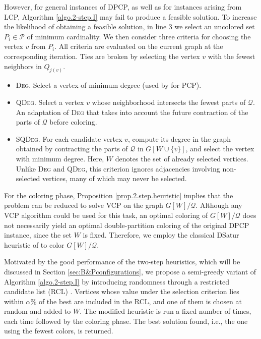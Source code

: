 \documentclass[preprint, 11pt, authoryear]{elsarticle}
\newcommand{\PP}{{\mathcal P}}
\newcommand{\QQ}{{\mathcal Q}}
\begin{document}
However, for general instances of DPCP, as well as for instances arising from LCP, Algorithm \ref{algo.2-step.I} may fail to produce a feasible solution. 
To increase the likelihood of obtaining a feasible solution, in line 3 we select an uncolored set $P_i \in \PP$ of minimum cardinality. 
We then consider three criteria for choosing the vertex $v$ from $P_i$.
All criteria are evaluated on the current graph at the corresponding iteration. Ties are broken by selecting the vertex $v$ with the fewest neighbors in $Q_{j(v)}$.
\begin{itemize}
\item[] \textsc{Deg.} Select a vertex of minimum degree (used by \cite{li2000partition} for PCP).
\item[] \textsc{QDeg.} Select a vertex $v$ whose neighborhood intersects the fewest parts of $\QQ$. An adaptation of \textsc{Deg} that takes into account the future contraction of the parts of $\QQ$ before coloring.
\item[] \textsc{SQDeg.} 
For each candidate vertex $v$, compute its degree in the graph obtained by contracting the parts of $\QQ$ in $G[W \cup \{v\}]$, and select the vertex with minimum degree. Here, $W$ denotes the set of already selected vertices. Unlike \textsc{Deg} and \textsc{QDeg}, this criterion ignores adjacencies involving non-selected vertices, many of which may never be selected.
\end{itemize}

For the coloring phase, Proposition \ref{prop.2.step.heuristic} implies that the problem can be reduced to solve VCP on the graph $G[W]/\QQ$.  Although any VCP algorithm could be used for this task, an optimal coloring of $G[W]/\QQ$ does not necessarily yield an optimal double-partition coloring of the original DPCP instance, since the set $W$ is fixed. 
Therefore, we employ the classical DSatur heuristic of \cite{brelaz1979new} to color $G[W]/\QQ$. 

Motivated by the good performance of the two-step heuristics, which will be discussed in Section \ref{sec:B&Pconfigurations}, we propose a semi-greedy variant of Algorithm \ref{algo.2-step.I} by introducing randomness through a restricted candidate list (RCL) \citep{Feo1995}.
Vertices whose value under the selection criterion lies within $\alpha\%$ of the best are included in the RCL, and one of them is chosen at random and added to $W$.
The modified heuristic is run a fixed number of times, each time followed by the coloring phase. 
The best solution found, i.e., the one using the fewest colors, is returned.
\end{document}
